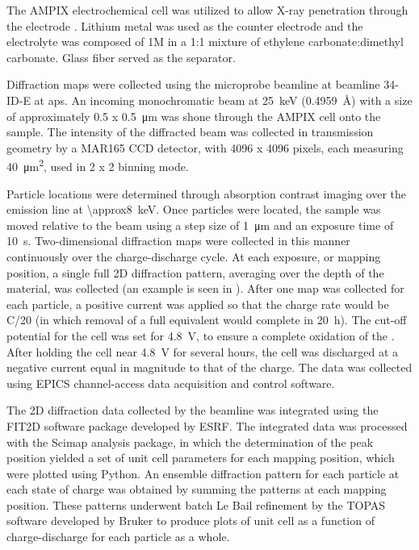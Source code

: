 \documentclass{article}
\begin{document}
The AMPIX electrochemical cell was utilized to allow X-ray penetration
through the electrode \cite{borkiewicz2012}. Lithium metal was used as
the counter electrode and the electrolyte was composed of 1M
 in a 1:1 mixture of ethylene carbonate:dimethyl
carbonate. Glass fiber served as the separator.

Diffraction maps were collected using the microprobe beamline at
beamline 34-ID-E at \gls{aps}. An incoming monochromatic beam at
\SI{25}{\kilo\electronvolt} (\SI{0.4959}{\angstrom}) with a size of
approximately \num{0.5} x \SI{0.5}{\micro\meter} was shone through the
AMPIX cell onto the sample. The intensity of the diffracted beam was
collected in transmission geometry by a MAR165 CCD detector, with 4096
x 4096 pixels, each measuring \SI{40}{\square\micro\meter}, used in 2
x 2 binning mode.

Particle locations were determined through absorption contrast imaging
over the  emission line at
\SI{\approx8}{\kilo\electronvolt}. Once particles were located, the
sample was moved relative to the beam using a step size of
\SI{1}{\micro\meter} and an exposure time of
\SI{10}{\second}. Two-dimensional diffraction maps were collected in
this manner continuously over the charge-discharge cycle. At each
exposure, or mapping position, a single full 2D diffraction pattern,
averaging over the depth of the material, was collected (an example is
seen in ). After one map was collected for
each particle, a positive current was applied so that the charge rate
would be C/20 (in which removal of a full  equivalent would
complete in \SI{20}{\hour}). The cut-off potential for the cell was
set for \SI{4.8}{\volt}, to ensure a complete oxidation of the
\nca{}. After holding the cell near \SI{4.8}{\volt} for several hours,
the cell was discharged at a negative current equal in magnitude to
that of the charge. The data was collected using EPICS channel-access
data acquisition and control software.

The 2D diffraction data collected by the beamline was integrated using
the FIT2D software package developed by
ESRF\cite{hausermann1996,hammersley1997}. The integrated data was
processed with the Scimap analysis package\cite{scimap}, in which the
determination of the peak position yielded a set of unit cell
parameters for each mapping position, which were plotted using
Python. An ensemble diffraction pattern for each particle at each
state of charge was obtained by summing the patterns at each mapping
position. These patterns underwent batch Le Bail refinement by the
TOPAS software developed by Bruker to produce plots of unit cell as a
function of charge-discharge for each particle as a whole.
\end{document}
